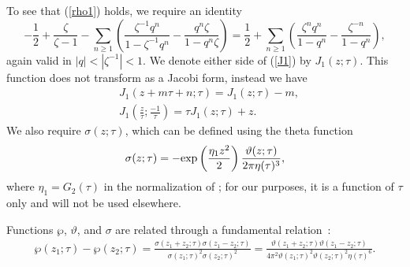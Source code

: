 \documentclass[10pt,a4paper]{amsart}
\numberwithin{equation}{section}
\theoremstyle{definition}
\begin{document}
To see that (\ref{rho1}) holds, we require an identity
\begin{equation} \label{J1}
-\frac12 +\frac{\zeta}{\zeta-1} - \sum_{n \geq 1}\left(\frac{ \zeta^{-1} q^n}{1- \zeta^{-1}q^n}-\frac{q^n \zeta}{1-q^n \zeta}\right)=\frac12+\sum_{n \geq 1} \left(\frac{\zeta^n q^n}{1-q^n}-\frac{\zeta^{-n}}{1-q^n} \right),
\end{equation}
again valid in $|q|<|\zeta^{-1}|<1$. We denote either side of (\ref{J1}) by $J_1(z;\tau)$.
This function does not transform as a Jacobi form, instead we have
\begin{align*}%
&J_1(z+ m \tau+n;\tau)= J_1(z;\tau)-m, \\
&J_1 \left(\frac{z}{\tau};\frac{-1}{\tau}\right)=\tau J_1(z;\tau)+z.
\end{align*}
We also require $\sigma(z;\tau)$, which can be defined using the theta function \cite{Lang}
\[
\sigma(z;\tau)=-{\rm exp}\left(\frac{\eta_1 z^2}{2}\right)\frac{\vartheta(z;\tau)}{2 \pi \eta(\tau)^3},
\]
where $\eta_1=G_2(\tau)$ in the normalization of \cite{Lang}; for our purposes, it is a function of $\tau$ only and will not be used elsewhere.

Functions $\wp$, $\vartheta$, and $\sigma$ are related through a fundamental relation~\cite{Lang}:
\begin{align}
\wp(z_1;\tau)-\wp(z_2;\tau)=\frac{\sigma(z_1+z_2;\tau)\sigma(z_1-z_2;\tau)}{\sigma(z_1;\tau)^2\sigma(z_2;\tau)^2} =\frac{\vartheta(z_1+z_2;\tau) \vartheta(z_1-z_2;\tau)}{ 4 \pi^2 \vartheta(z_1;\tau)^2 \vartheta(z_2;\tau)^2 \eta(\tau)^6}.\label{rho-sigma}
\end{align}
\end{document}
